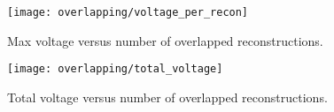 \begin{figure}
\centering
\texttt{[image: overlapping/voltage\_per\_recon]}
\caption[Max \ptp{} voltage from overlapped reconstructions]{Max \ptp{} voltage versus number of overlapped reconstructions.}
\label{fig:overlapping-vpp}

\vspace*{\floatsep}%

\texttt{[image: overlapping/total\_voltage]}
\caption[Total \ptp{} voltage from overlapped reconstructions]{Total \ptp{} voltage versus number of overlapped reconstructions.}
\label{fig:overlapping-total-voltage}
\end{figure}

